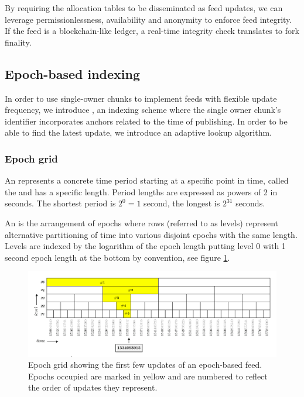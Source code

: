 By requiring the allocation tables to be disseminated as feed updates, we can leverage permissionlessness, availability and anonymity to enforce feed integrity. If the feed is a blockchain-like ledger, a real-time integrity check translates to fork finality. 


\subsection{Epoch-based 
indexing \statusyellow}\label{sec:epoch-based-feeds}

\yellow{}

In order to use single-owner chunks to implement feeds with flexible update frequency, we introduce , an indexing scheme where the single owner chunk's identifier incorporates anchors related to the time of publishing. In order to be able to find the latest update, we introduce
an adaptive lookup algorithm. 

\subsubsection{Epoch grid}

An  represents a concrete time period starting at a specific point in time, called the  and has a specific length.  
Period lengths are expressed as powers of 2 in seconds. The shortest period is $2^0 = 1$ second, the longest is $2^{31}$ seconds. 

An  is the arrangement of epochs where rows (referred to as levels) represent alternative partitioning of time into various disjoint epochs with the same length. Levels are indexed by the logarithm of the epoch length putting level 0 with 1 second epoch length at the bottom by convention, see figure \ref{fig:epoch-grid}.

\begin{figure}[htbp]
\centering
\includegraphics[width=\textwidth]{fig/epoch-grid.pdf}
\caption[Epoch grid with epoch-based feed updates\statusorange]{Epoch grid showing the first few updates of an epoch-based feed. Epochs occupied are marked in yellow and are numbered to reflect the order of updates they represent. }
\label{fig:epoch-grid}
\end{figure}

